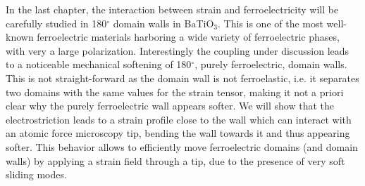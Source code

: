 In the last chapter, the interaction between strain and ferroelectricity will be carefully studied in 180$^\circ$ domain walls in BaTiO$_3$.
This is one of the most well-known ferroelectric materials harboring a wide variety of ferroelectric phases, with very a large polarization.
Interestingly the coupling under discussion leads to a noticeable mechanical softening of 180$^\circ$, purely ferroelectric, domain walls.
This is not straight-forward as the domain wall is not ferroelastic, i.e. it separates two domains with the same values for the strain tensor, making it not a priori clear why the purely ferroelectric wall appears softer.
We will show that the electrostriction leads to a strain profile close to the wall which can interact with an atomic force microscopy tip, bending the wall towards it and thus appearing softer.
This behavior allows to efficiently move ferroelectric domains (and domain walls) by applying a strain field through a tip, due to the presence of very soft sliding modes. 


